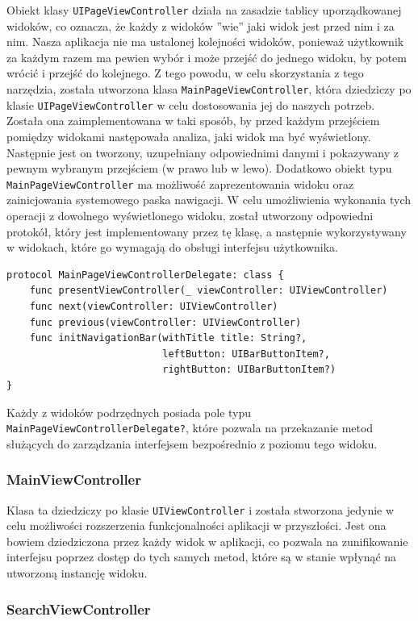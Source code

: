 \documentclass[twoside]{projektInzynierskiMS}
\begin{document}
Obiekt klasy \verb`UIPageViewController` działa na zasadzie tablicy uporządkowanej widoków, co oznacza, że każdy z widoków ''wie'' jaki widok jest przed nim i za nim. Nasza aplikacja nie ma ustalonej kolejności widoków, ponieważ użytkownik za każdym razem ma pewien wybór i może przejść do jednego widoku, by potem wrócić i przejść do kolejnego. Z tego powodu, w celu skorzystania z tego narzędzia, została utworzona klasa \verb`MainPageViewController`, która dziedziczy po klasie \verb`UIPageViewController` w celu dostosowania jej do naszych potrzeb. Została ona zaimplementowana w taki sposób, by przed każdym przejściem pomiędzy widokami następowała analiza, jaki widok ma być wyświetlony. Następnie jest on tworzony, uzupełniany odpowiednimi danymi i pokazywany z pewnym wybranym przejściem (w prawo lub w lewo). Dodatkowo obiekt typu \verb`MainPageViewController` ma możliwość zaprezentowania widoku oraz zainicjowania systemowego paska nawigacji. W celu umożliwienia wykonania tych operacji z dowolnego wyświetlonego widoku, został utworzony odpowiedni protokół, który jest implementowany przez tę klasę, a następnie wykorzystywany w widokach, które go wymagają do obsługi interfejsu użytkownika.
\begin{verbatim}
protocol MainPageViewControllerDelegate: class {
    func presentViewController(_ viewController: UIViewController)
    func next(viewController: UIViewController)
    func previous(viewController: UIViewController)
    func initNavigationBar(withTitle title: String?,
                           leftButton: UIBarButtonItem?,
   	                       rightButton: UIBarButtonItem?)
}
\end{verbatim}
Każdy z widoków podrzędnych posiada pole typu \verb`MainPageViewControllerDelegate?`, które pozwala na przekazanie metod służących do zarządzania interfejsem bezpośrednio z poziomu tego widoku.


\subsubsection{MainViewController}

Klasa ta dziedziczy po klasie \verb`UIViewController` i została stworzona jedynie w celu możliwości rozszerzenia funkcjonalności aplikacji w przyszłości. Jest ona bowiem dziedziczona przez każdy widok w aplikacji, co pozwala na zunifikowanie interfejsu poprzez dostęp do tych samych metod, które są w stanie wpłynąć na utworzoną instancję widoku.


\subsubsection{SearchViewController}
\end{document}
